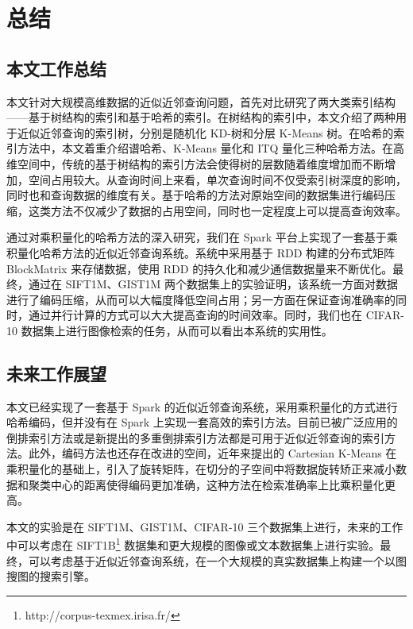 

\chapter{总结}
\label{cha:conclusion}
\section{本文工作总结}
本文针对大规模高维数据的近似近邻查询问题，首先对比研究了两大类索引结构——基于树结构的索引和基于哈希的索引。在树结构的索引中，本文介绍了两种用于近似近邻查询的索引树，分别是随机化 KD-树和分层 K-Means 树。在哈希的索引方法中，本文着重介绍谱哈希、K-Means 量化和 ITQ 量化三种哈希方法。在高维空间中，传统的基于树结构的索引方法会使得树的层数随着维度增加而不断增加，空间占用较大。从查询时间上来看，单次查询时间不仅受索引树深度的影响，同时也和查询数据的维度有关。基于哈希的方法对原始空间的数据集进行编码压缩，这类方法不仅减少了数据的占用空间，同时也一定程度上可以提高查询效率。

通过对乘积量化的哈希方法的深入研究，我们在 Spark 平台上实现了一套基于乘积量化哈希方法的近似近邻查询系统。系统中采用基于 RDD 构建的分布式矩阵 BlockMatrix 来存储数据，使用 RDD 的持久化和减少通信数据量来不断优化。最终，通过在 SIFT1M、GIST1M 两个数据集上的实验证明，该系统一方面对数据进行了编码压缩，从而可以大幅度降低空间占用；另一方面在保证查询准确率的同时，通过并行计算的方式可以大大提高查询的时间效率。同时，我们也在 CIFAR-10 数据集上进行图像检索的任务，从而可以看出本系统的实用性。
\section{未来工作展望}
本文已经实现了一套基于 Spark 的近似近邻查询系统，采用乘积量化的方式进行哈希编码，但并没有在 Spark 上实现一套高效的索引方法。目前已被广泛应用的倒排索引方法或是新提出的多重倒排索引方法\cite{BabenkoL12}都是可用于近似近邻查询的索引方法。此外，编码方法也还存在改进的空间，近年来提出的 Cartesian K-Means\cite{Norouzi13} 在乘积量化的基础上，引入了旋转矩阵，在切分的子空间中将数据旋转矫正来减小数据和聚类中心的距离使得编码更加准确，这种方法在检索准确率上比乘积量化更高。

本文的实验是在 SIFT1M、GIST1M、CIFAR-10 三个数据集上进行，未来的工作中可以考虑在 SIFT1B\footnote{http://corpus-texmex.irisa.fr/} 数据集和更大规模的图像或文本数据集上进行实验。最终，可以考虑基于近似近邻查询系统，在一个大规模的真实数据集上构建一个以图搜图的搜索引擎。


